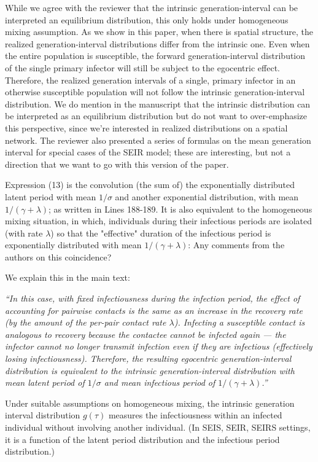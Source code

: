 \documentclass[12pt]{article}
\newcommand{\revtext}{\textsf}
\newcommand{\newtext}[1]{\textsl{``#1''}}
\begin{document}
While we agree with the reviewer that the intrinsic generation-interval can be interpreted an equilibrium distribution, this only holds under homogeneous mixing assumption. 
As we show in this paper, when there is spatial structure, the realized generation-interval distributions differ from the intrinsic one. 
Even when the entire population is susceptible, the forward generation-interval distribution of the single primary infector will still be subject to the egocentric effect.
Therefore, the realized generation intervals of a single, primary infector in an otherwise susceptible population will not follow the intrinsic generation-interval distribution. We do mention in the manuscript that the intrinsic distribution can be interpreted as an equilibrium distribution but do not want to over-emphasize this perspective, since we're interested in realized distributions on a spatial network.
The reviewer also presented a series of formulas on the mean generation interval for special cases of the SEIR model; these are interesting, but not a direction that we want to go with this version of the paper.

\revtext{
Expression (13) is the convolution (the sum of) the exponentially
distributed latent period with mean $1/\sigma$ and another exponential distribution, with mean $1/(\gamma+\lambda)$; as written in Lines 188-189. It is also equivalent
to the homogeneous mixing situation, in which, individuals during their
infectious periods are isolated (with rate $\lambda$) so that the "effective" duration
of the infectious period is exponentially distributed with mean $1/(\gamma + \lambda)$:
Any comments from the authors on this coincidence?
}

We explain this in the main text:

\newtext{In this case, with fixed infectiousness during the infection period, the effect of accounting for pairwise contacts is the same as an increase in the recovery rate (by the amount of the per-pair contact rate $\lambda$). 
Infecting a susceptible contact is analogous to recovery because the contactee cannot be infected again --- the infector cannot no longer transmit infection even if they are infectious (effectively losing infectiousness).
Therefore, the resulting egocentric generation-interval distribution is equivalent to the intrinsic generation-interval distribution with mean latent period of $1/\sigma$ and mean infectious period of $1/(\gamma + \lambda)$.}

\revtext{Under suitable assumptions on homogeneous mixing, the intrinsic
generation interval distribution $g(\tau)$ measures the infectiousness within
an infected individual without involving another individual. (In SEIS,
SEIR, SEIRS settings, it is a function of the latent period distribution
and the infectious period distribution.)}
\end{document}

